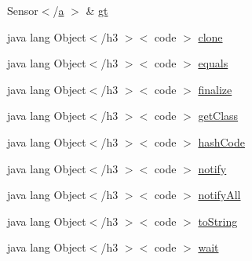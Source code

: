 \begin{DoxyCompactItemize}
 Sensor$<$/\hyperlink{style_8css_a5e8981582017bb8b84c21f148345d1f7}{a} $>$ \& \hyperlink{_station_8html_aad64e630bab1a992ddc6a0aa39811222}{gt}
\item 
java lang Object$<$/h3 $>$$<$ code $>$ \hyperlink{_station_8html_adc9607fcabf6f2d7f401ad52015ef6e0}{clone}
\item 
java lang Object$<$/h3 $>$$<$ code $>$ \hyperlink{_station_8html_a8974318cea585f72df717e0380ec7104}{equals}
\item 
java lang Object$<$/h3 $>$$<$ code $>$ \hyperlink{_station_8html_ab2315181ead4aeedef2374039b6ddde7}{finalize}
\item 
java lang Object$<$/h3 $>$$<$ code $>$ \hyperlink{_station_8html_a98e6644727fe65eac217a6855045be43}{get\-Class}
\item 
java lang Object$<$/h3 $>$$<$ code $>$ \hyperlink{_station_8html_a8e178e2bb2bef055ea23ea3910a221ca}{hash\-Code}
\item 
java lang Object$<$/h3 $>$$<$ code $>$ \hyperlink{_station_8html_ae99ae10b5010594dbda4794e02db271b}{notify}
\item 
java lang Object$<$/h3 $>$$<$ code $>$ \hyperlink{_station_8html_a1279357e6e09e33e75b55eb05fdb6436}{notify\-All}
\item 
java lang Object$<$/h3 $>$$<$ code $>$ \hyperlink{_station_8html_a36e8a76a4132c9a7081416f27d087615}{to\-String}
\item 
java lang Object$<$/h3 $>$$<$ code $>$ \hyperlink{_station_8html_a9a9f0c22e5688d478c707f910f1c1aea}{wait}
\end{DoxyCompactItemize}


